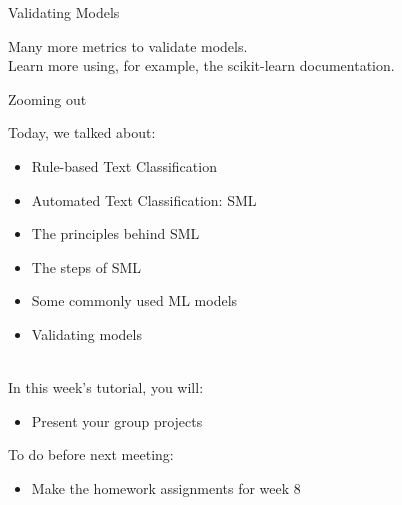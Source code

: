 \documentclass[handout]{beamer}
\begin{document}
\begin{frame}{Validating Models}
	
	Many more metrics to validate models. \\
	
	Learn more using, for example, the scikit-learn documentation. 
	
\end{frame}



\begin{frame}{Zooming out} 
	
Today, we talked about:
\begin{itemize}
	\item Rule-based Text Classification
	\item Automated Text Classification: SML
	\item The principles behind SML
	\item The steps of SML
	\item Some commonly used ML models
	\item Validating models \\\
\end{itemize}

In this week's tutorial, you will:
\begin{itemize}
	\item Present your group projects
\end{itemize}
	
\end{frame}


\begin{frame}
	
To do before next meeting:
	\begin{itemize}
		\item Make the homework assignments for week 8
	\end{itemize}
	
\end{frame}



	
\end{document}
